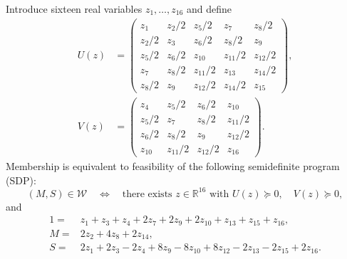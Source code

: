 \documentclass[11pt]{article}
\theoremstyle{remark}\newtheorem{remark}[theorem]{Remark}
\newcommand{\W}{\mathcal W}\newcommand{\sxdeg}{\operatorname{sxdeg}}
\begin{document}
Introduce sixteen real variables \(z_1,\ldots,z_{16}\) and define
\begin{equation}
\begin{split}
 U(z)&=
 \begin{pmatrix}
 z_1&z_2/2&z_5/2&z_7&z_8/2\\
 z_2/2&z_3&z_6/2&z_8/2&z_9\\
 z_5/2&z_6/2&z_{10}&z_{11}/2&z_{12}/2\\
 z_7&z_8/2&z_{11}/2&z_{13}&z_{14}/2\\
 z_8/2&z_9&z_{12}/2&z_{14}/2&z_{15}
 \end{pmatrix},\\[2pt]
 V(z)&=
 \begin{pmatrix}
 z_4&z_5/2&z_6/2&z_{10}\\
 z_5/2&z_7&z_8/2&z_{11}/2\\
 z_6/2&z_8/2&z_9&z_{12}/2\\
 z_{10}&z_{11}/2&z_{12}/2&z_{16}
 \end{pmatrix}.
\end{split}\label{eq:dualmat}
\end{equation}
Membership is equivalent to feasibility of the following semidefinite
program (SDP):
\[
 (M,S)\in\W\quad\Longleftrightarrow\quad
 \text{there exists }z\in\mathbb R^{16}
 \text{ with }U(z)\succeq0,\quad V(z)\succeq0,
\]
and
\begin{align}
 1={}&z_1+z_3+z_4+2z_7+2z_9+2z_{10}+z_{13}+z_{15}+z_{16},\nonumber\\
 M={}&2z_2+4z_8+2z_{14},\nonumber\\
 S={}&2z_1+2z_3-2z_4+8z_9-8z_{10}+8z_{12}
       -2z_{13}-2z_{15}+2z_{16}.
 \label{eq:coords}
\end{align}
\end{document}
